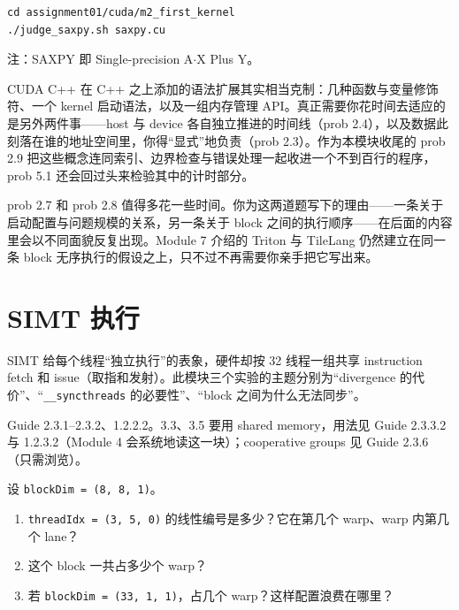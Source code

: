 \documentclass[11pt,a4paper,fontset=none]{ctexart}
\begin{document}
\begin{lstlisting}
cd assignment01/cuda/m2_first_kernel
./judge_saxpy.sh saxpy.cu
\end{lstlisting}

注：SAXPY 即 Single-precision A$\cdot$X Plus Y。

\begin{lookback}
  CUDA C++ 在 C++ 之上添加的语法扩展其实相当克制：几种函数与变量修饰符、一个 kernel 启动语法，以及一组内存管理 API。真正需要你花时间去适应的是另外两件事——host 与 device 各自独立推进的时间线（prob 2.4），以及数据此刻落在谁的地址空间里，你得“显式”地负责（prob 2.3）。作为本模块收尾的 prob 2.9 把这些概念连同索引、边界检查与错误处理一起收进一个不到百行的程序，prob 5.1 还会回过头来检验其中的计时部分。

  prob 2.7 和 prob 2.8 值得多花一些时间。你为这两道题写下的理由——一条关于启动配置与问题规模的关系，另一条关于 block 之间的执行顺序——在后面的内容里会以不同面貌反复出现。Module 7 介绍的 Triton 与 TileLang 仍然建立在同一条 block 无序执行的假设之上，只不过不再需要你亲手把它写出来。
\end{lookback}

\section{SIMT 执行}

SIMT 给每个线程“独立执行”的表象，硬件却按 32 线程一组共享 instruction fetch 和 issue（取指和发射）。此模块三个实验的主题分别为“divergence 的代价”、“\texttt{\_\_syncthreads} 的必要性”、“block 之间为什么无法同步”。

\begin{reading}
  Guide 2.3.1--2.3.2、1.2.2.2。3.3、3.5 要用 shared memory，用法见 Guide 2.3.3.2 与 1.2.3.2（Module 4 会系统地读这一块）；cooperative groups 见 Guide 2.3.6（只需浏览）。
\end{reading}

设 \texttt{blockDim = (8, 8, 1)}。
\begin{enumerate}[label=(\alph*)]
  \item \texttt{threadIdx = (3, 5, 0)} 的线性编号是多少？它在第几个 warp、warp 内第几个 lane？
  \item 这个 block 一共占多少个 warp？
  \item 若 \texttt{blockDim = (33, 1, 1)}，占几个 warp？这样配置浪费在哪里？
\end{enumerate}
\end{document}

